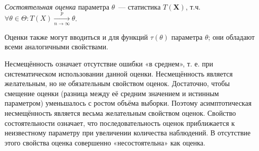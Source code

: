 \begin{defn}
{\it Состоятельная оценка} параметра $\theta$~--- статистика $T(\mathbf{X})$, т.ч. $\forall \theta \in \Theta: T(X) \xrightarrow[n \rightarrow \infty]{p} \theta$.
\end{defn}

Оценки также могут вводиться и для функций $\tau(\theta)$ параметра $\theta$; они обладают всеми аналогичными свойствами.

Несмещённость означает отсутствие ошибки «в среднем», т. е. при систематическом использовании данной оценки. Несмещённость является желательным, но не обязательным свойством оценок. Достаточно, чтобы смещение оценки (разница между её средним значением и истинным параметром) уменьшалось с ростом объёма выборки. Поэтому асимптотическая несмещённость является весьма желательным свойством оценок. Свойство состоятельности означает, что последовательность оценок приближается к неизвестному параметру при увеличении количества наблюдений. В отсутствие этого свойства оценка совершенно «несостоятельна» как оценка.

